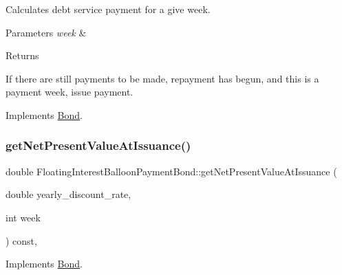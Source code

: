 Calculates debt service payment for a give week. 
\begin{DoxyParams}{Parameters}
{\em week} & \\
\hline
\end{DoxyParams}
\begin{DoxyReturn}{Returns}

\end{DoxyReturn}
If there are still payments to be made, repayment has begun, and this is a payment week, issue payment. 

Implements \mbox{\hyperlink{classBond_a98d8ecaf4b36319674ebd220598996bc}{Bond}}.

\mbox{\label{classFloatingInterestBalloonPaymentBond_a90205e26e09eef1227f8c0671ca4fce2}} 
\subsubsection{\texorpdfstring{get\+Net\+Present\+Value\+At\+Issuance()}{getNetPresentValueAtIssuance()}}
{\footnotesize\ttfamily double Floating\+Interest\+Balloon\+Payment\+Bond\+::get\+Net\+Present\+Value\+At\+Issuance (\begin{DoxyParamCaption}\item[{double}]{yearly\+\_\+discount\+\_\+rate,  }\item[{int}]{week }\end{DoxyParamCaption}) const\hspace{0.3cm}{\ttfamily [override]}, {\ttfamily [virtual]}}



Implements \mbox{\hyperlink{classBond_a5997278813deb16aa5d01bbca8ecc7b2}{Bond}}.

\mbox{\label{classFloatingInterestBalloonPaymentBond_a4cf110f320c92f5eca9aed952e0b527a}} 
